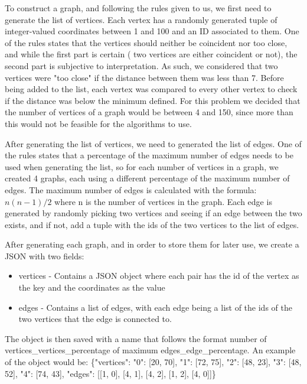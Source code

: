 \documentclass[]{revdetua}
\begin{document}
To construct a graph, and following the rules given to us, we first need to generate the list of vertices. Each vertex has a randomly generated tuple of integer-valued coordinates between 1 and 100 and an ID associated to them. One of the rules states that the vertices should neither be coincident nor too close, and while the first part is certain ( two vertices are either coincident or not), the second part is subjective to interpretation. As such, we considered that two vertices were "too close" if the distance between them was less than 7. Before being added to the list, each vertex was compared to every other vertex to check if the distance was below the minimum defined. For this problem we decided that the number of vertices of a graph would be between 4 and 150, since more than this would not be feasible for the algorithms to use.

After generating the list of vertices, we need to generated the list of edges. One of the rules states that a percentage of the maximum number of edges needs to be used when generating the list, so for each number of vertices in a graph, we created 4 graphs, each using a different percentage of the maximum number of edges. The maximum number of edges is calculated with the formula: \( n(n-1)/2 \) where n is the number of vertices in the graph. Each edge is generated by randomly picking two vertices and seeing if an edge between the two exists, and if not, add a tuple with the ids of the two vertices to the list of edges.

After generating each graph, and in order to store them for later use, we create a JSON with two fields:

\begin{itemize}
    \item vertices - Contains a JSON object where each pair has the id of the vertex as the key and the coordinates as the value
    \item edges - Contains a list of edges, with each edge being a list of the ids of the two vertices that the edge is connected to.
\end{itemize}

The object is then saved with a name that follows the format {number of vertices}\_vertices\_{percentage of maximum edges}\_edge\_percentage. An example of the object would be:
\linebreak \linebreak
 \{"vertices": {"0": [20, 70], "1": [72, 75], "2": [48, 23], "3": [48, 52], "4": [74, 43]}, "edges": [[1, 0], [4, 1], [4, 2], [1, 2], [4, 0]]\}
\linebreak
\end{document}
